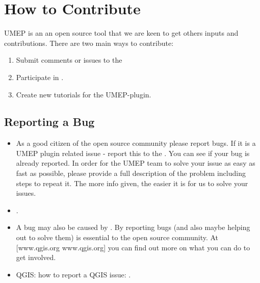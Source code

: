 \documentclass[letterpaper,10pt,english]{sphinxmanual}
\begin{document}
\chapter{How to Contribute}
\label{\detokenize{How_to_Contribute:how-to-contribute}}\label{\detokenize{How_to_Contribute:id1}}\label{\detokenize{How_to_Contribute::doc}}
UMEP is an an open source tool that we are keen to get others inputs and
contributions. There are two main ways to contribute:
\begin{enumerate}
\item {} 
Submit comments or issues to the

\item {} 
Participate in .

\item {} 
Create new tutorials for the UMEP-plugin.

\end{enumerate}


\section{Reporting a Bug}
\label{\detokenize{How_to_Contribute:reporting-a-bug}}\begin{itemize}
\item {} 
As a good citizen of the open source community please report bugs. If
it is a UMEP plugin related issue - report this to the
. You can
see if your bug is already reported. In order for the UMEP team to
solve your issue as easy as fast as possible, please provide a full
description of the problem including steps to repeat it. The more
info given, the easier it is for us to solve your issues.

\item {} 
.

\item {} 
A bug may also be caused by . By
reporting bugs (and also maybe helping out to solve them) is
essential to the open source community. At {[}www.qgis.org
www.qgis.org{]} you can find out more on what you can do to get
involved.

\item {} 
QGIS: how to report a QGIS issue:
.

\end{itemize}
\end{document}
